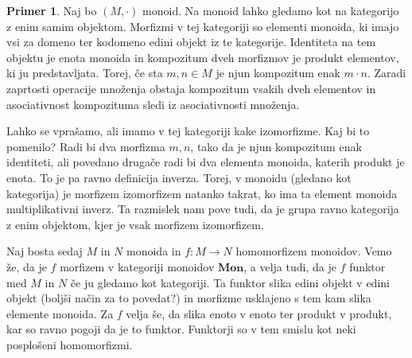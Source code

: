 \documentclass[12pt,a4paper]{book}
\theoremstyle{definition}
\theoremstyle{plain}
\theoremstyle{definition}
\newtheorem{primer}{Primer}[section]
\theoremstyle{remark}
\newcommand{\cat}[1]{\textbf{#1}}
\begin{document}
\begin{primer}
Naj bo $(M,\cdot)$ monoid. Na monoid lahko gledamo kot na kategorijo z enim samim objektom. Morfizmi v tej kategoriji so elementi monoida, ki imajo vsi za domeno ter kodomeno edini objekt iz te kategorije. Identiteta na tem objektu je enota monoida in kompozitum dveh morfizmov je produkt elementov, ki ju predstavljata. Torej, če sta $m,n \in M$ je njun kompozitum enak $m \cdot n$. Zaradi zaprtosti operacije množenja obstaja kompozitum vsakih dveh elementov in asociativnost kompozituma sledi iz asociativnosti množenja.

Lahko se vprašamo, ali imamo v tej kategoriji kake izomorfizme. Kaj bi to pomenilo? Radi bi dva morfizma $m,n$, tako da je njun kompozitum enak identiteti, ali povedano drugače radi bi dva elementa monoida, katerih produkt je enota. To je pa ravno definicija inverza. Torej, v monoidu (gledano kot kategorija) je morfizem izomorfizem natanko takrat, ko ima ta element monoida multiplikativni inverz. Ta razmislek nam pove tudi, da je grupa ravno kategorija z enim objektom, kjer je vsak morfizem izomorfizem.

Naj bosta sedaj $M$ in $N$ monoida in $f : M \to N$ homomorfizem monoidov. Vemo že, da je $f$ morfizem v kategoriji monoidov $\cat{Mon}$, a velja tudi, da je $f$ funktor med $M$ in $N$ če ju gledamo kot kategoriji. Ta funktor slika edini objekt v edini objekt (boljši način za to povedat?) in morfizme usklajeno s tem kam slika elemente monoida. Za $f$ velja še, da slika enoto v enoto ter produkt v produkt, kar so ravno pogoji da je to funktor. Funktorji so v tem smislu kot neki posplošeni homomorfizmi.
\end{primer}
\end{document}
